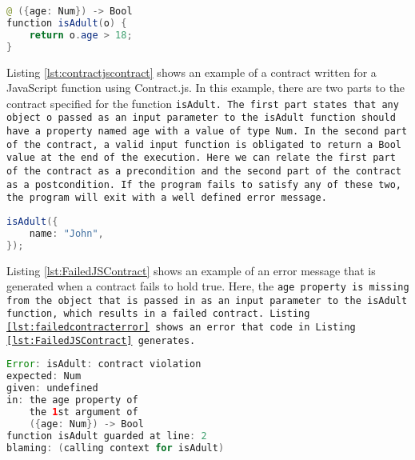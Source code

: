\begin{minipage}{\linewidth}       
\begin{lstlisting}[frame=single, language=Java, caption={Contract using Contract.js},label={lst:contractjscontract}, captionpos=b, breaklines=true]
@ ({age: Num}) -> Bool
function isAdult(o) {
    return o.age > 18;
}    
\end{lstlisting}
\end{minipage}

Listing \ref{lst:contractjscontract} shows an example of a contract written for a JavaScript function using Contract.js. In this example, there are two parts to the contract specified for the function \tt{isAdult}. The first part states that any object o passed as an input parameter to the \tt{isAdult} function should have a property named \tt{age} with a value of type \tt{Num}. In the second part of the contract, a valid input function is obligated to return a \tt{Bool} value at the end of the execution. Here we can relate the first part of the contract as a precondition and the second part of the contract as a postcondition. If the program fails to satisfy any of these two, the program will exit with a well defined error message.\linebreak

\begin{minipage}{\linewidth}
\begin{lstlisting}[frame=single, language=Java, caption={Example of a failed contract}, label={lst:FailedJSContract}, captionpos=b]
isAdult({
    name: "John",
});    
\end{lstlisting}
\end{minipage}
Listing \ref{lst:FailedJSContract} shows an example of an error message that is generated when a contract fails to hold true.
Here, the \tt{age} property is missing from the object that is passed in as an input parameter to the \tt{isAdult} function, which results in a failed contract. Listing \ref{lst:failedcontracterror} shows an error that code in Listing \ref{lst:FailedJSContract} generates.
\linebreak

\begin{minipage}{\linewidth}
\begin{lstlisting}[frame=single, language=Java, caption={Error message on failed contract}, label={lst:failedcontracterror}, captionpos=b, breaklines=true]
Error: isAdult: contract violation
expected: Num
given: undefined
in: the age property of
    the 1st argument of
    ({age: Num}) -> Bool
function isAdult guarded at line: 2
blaming: (calling context for isAdult)

\end{lstlisting}
\end{minipage}

